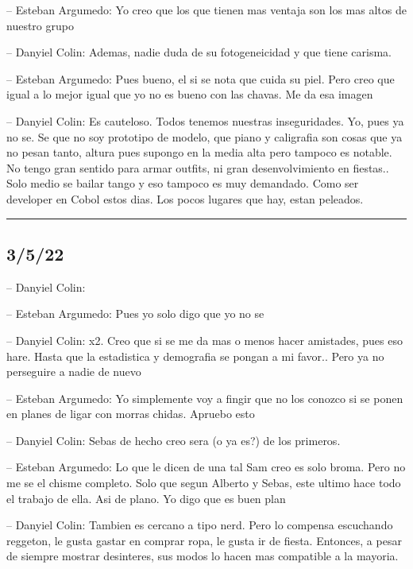 -- Esteban Argumedo: Yo creo que los que tienen mas ventaja son los mas
altos de nuestro grupo

-- Danyiel Colin: Ademas, nadie duda de su fotogeneicidad y que tiene
carisma.

-- Esteban Argumedo: Pues bueno, el si se nota que cuida su piel. Pero
creo que igual a lo mejor igual que yo no es bueno con las chavas. Me da
esa imagen

-- Danyiel Colin: Es cauteloso. Todos tenemos nuestras inseguridades.
Yo, pues ya no se. Se que no soy prototipo de modelo, que piano y
caligrafia son cosas que ya no pesan tanto, altura pues supongo en la
media alta pero tampoco es notable. No tengo gran sentido para armar
outfits, ni gran desenvolvimiento en fiestas.. Solo medio se bailar
tango y eso tampoco es muy demandado. Como ser developer en Cobol estos
dias. Los pocos lugares que hay, estan peleados.

\begin{center}\rule{0.5\linewidth}{0.5pt}\end{center}

\hypertarget{section-24}{%
\subsection{3/5/22}\label{section-24}}

-- Danyiel Colin:

-- Esteban Argumedo: Pues yo solo digo que yo no se

-- Danyiel Colin: x2. Creo que si se me da mas o menos hacer amistades,
pues eso hare. Hasta que la estadistica y demografia se pongan a mi
favor.. Pero ya no perseguire a nadie de nuevo

-- Esteban Argumedo: Yo simplemente voy a fingir que no los conozco si
se ponen en planes de ligar con morras chidas. Apruebo esto

-- Danyiel Colin: Sebas de hecho creo sera (o ya es?) de los primeros.

-- Esteban Argumedo: Lo que le dicen de una tal Sam creo es solo broma.
Pero no me se el chisme completo. Solo que segun Alberto y Sebas, este
ultimo hace todo el trabajo de ella. Asi de plano. Yo digo que es buen
plan

-- Danyiel Colin: Tambien es cercano a tipo nerd. Pero lo compensa
escuchando reggeton, le gusta gastar en comprar ropa, le gusta ir de
fiesta. Entonces, a pesar de siempre mostrar desinteres, sus modos lo
hacen mas compatible a la mayoria.

